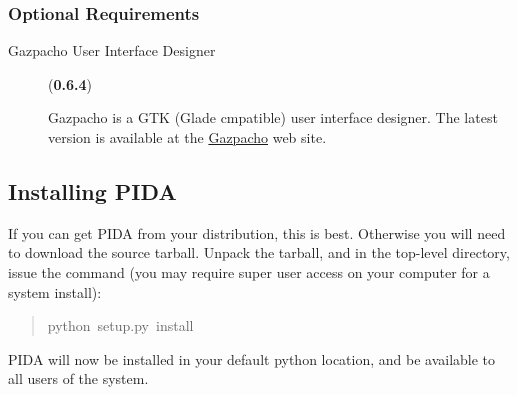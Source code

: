 \documentclass[10pt,a4paper,english]{article}
\newlength{\admonitionwidth}
\begin{document}

\hypertarget{optional-requirements}{}
\subsubsection*{Optional Requirements}
\begin{description}
\item[Gazpacho User Interface Designer] (\textbf{0.6.4})

Gazpacho is a GTK (Glade cmpatible) user interface designer. The latest
version is available at the \href{http://gazpacho.sicem.biz/}{Gazpacho} web site.

\end{description}



\hypertarget{installing-pida}{}
\subsection*{Installing PIDA}

If you can get PIDA from your distribution, this is best. Otherwise you will
need to download the source tarball. Unpack the tarball, and in the top-level
directory, issue the command (you may require super user access on your computer for a system install):
\begin{quote}{\ttfamily \raggedright \noindent
python~setup.py~install
}\end{quote}

PIDA will now be installed in your default python location, and be available
to all users of the system.
\begin{center}\begin{sffamily}
\end{sffamily}
\end{center}


\end{document}

